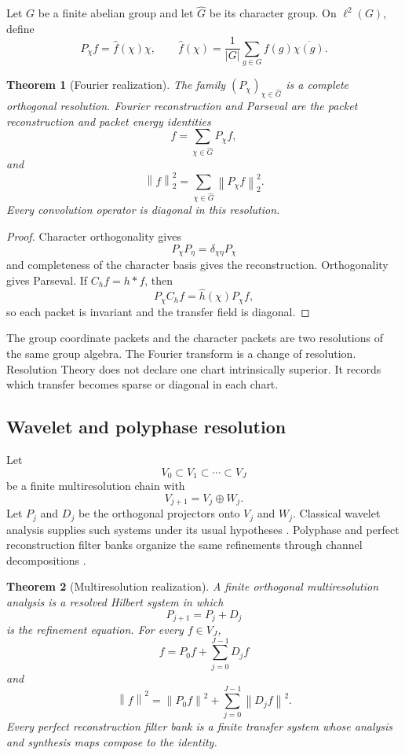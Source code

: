 \documentclass{aomart}
\newtheorem{theorem}{Theorem}[section]
\theoremstyle{definition}
\theoremstyle{remark}
\newcommand{\norm}[1]{\left\lVert#1\right\rVert}
\newcommand{\Rcite}[1]{\cite{#1}}
\begin{document}
Let \(G\) be a finite abelian group and let \(\widehat G\) be its character group. On \(\ell^2(G)\), define
\[
 P_\chi f
 =
 \widehat f(\chi)\chi,
 \qquad
 \widehat f(\chi)
 =
 \frac1{|G|}\sum_{g\in G}f(g)\overline{\chi(g)}.
\]

\begin{theorem}[Fourier realization]\label{thm:fourier_realization}
The family \((P_\chi)_{\chi\in\widehat G}\) is a complete orthogonal resolution. Fourier reconstruction and Parseval are the packet reconstruction and packet energy identities
\[
 \boxed{
 f=\sum_{\chi\in\widehat G}P_\chi f,
 }
\]
and
\[
 \boxed{
 \norm{f}_2^2
 =
 \sum_{\chi\in\widehat G}\norm{P_\chi f}_2^2.
 }
\]
Every convolution operator is diagonal in this resolution.
\end{theorem}

\begin{proof}
Character orthogonality gives
\[
 P_\chi P_\eta
 =
 \delta_{\chi\eta}P_\chi
\]
and completeness of the character basis gives the reconstruction. Orthogonality gives Parseval. If \(C_hf=h*f\), then
\[
 P_\chi C_hf
 =
 \widehat h(\chi)P_\chi f,
\]
so each packet is invariant and the transfer field is diagonal.
\end{proof}

\begin{remark}\label{rem:fourier_chart}
The group coordinate packets and the character packets are two resolutions of the same group algebra. The Fourier transform is a change of resolution. Resolution Theory does not declare one chart intrinsically superior. It records which transfer becomes sparse or diagonal in each chart.
\end{remark}

\subsection{Wavelet and polyphase resolution}

Let
\[
 V_0\subset V_1\subset\cdots\subset V_J
\]
be a finite multiresolution chain with
\[
 V_{j+1}=V_j\oplus W_j.
\]
Let \(P_j\) and \(D_j\) be the orthogonal projectors onto \(V_j\) and \(W_j\). Classical wavelet analysis supplies such systems under its usual hypotheses \Rcite{R16}. Polyphase and perfect reconstruction filter banks organize the same refinements through channel decompositions \Rcite{R17}.

\begin{theorem}[Multiresolution realization]\label{thm:wavelet_realization}
A finite orthogonal multiresolution analysis is a resolved Hilbert system in which
\[
 P_{j+1}=P_j+D_j
\]
is the refinement equation. For every \(f\in V_J\),
\[
 \boxed{
 f=P_0f+\sum_{j=0}^{J-1}D_jf
 }
\]
and
\[
 \boxed{
 \norm f^2
 =
 \norm{P_0f}^2
 +
 \sum_{j=0}^{J-1}\norm{D_jf}^2.
 }
\]
Every perfect reconstruction filter bank is a finite transfer system whose analysis and synthesis maps compose to the identity.
\end{theorem}
\end{document}
